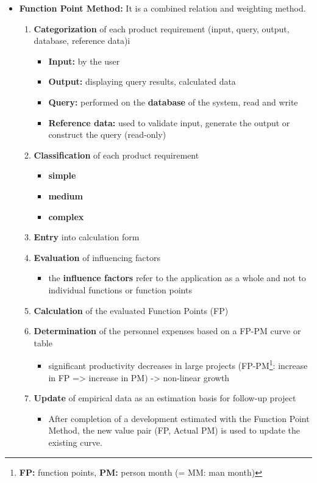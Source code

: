 \documentclass[ieeetran]{article}
\begin{document}
\begin{itemize}
\item \textbf{Function Point Method:} It is a combined relation and weighting method.
	\begin{enumerate}
	  \item \textbf{Categorization} of each product requirement (input, query, output, database, reference data)i
		  \begin{itemize}
		    \item \textbf{Input:} by the user
		\item \textbf{Output:} displaying query results, calculated data
		\item \textbf{Query:} performed on the \textbf{database} of the system, read and write
		\item \textbf{Reference data:} used to validate input, generate the output or construct the query (read-only)
		  \end{itemize}
\item \textbf{Classification} of each product requirement
	\begin{itemize}
	  \item \textbf{simple}
	  \item \textbf{medium} 
	  \item \textbf{complex} 
	\end{itemize}
	\item \textbf{Entry} into calculation form
	\item \textbf{Evaluation} of influencing factors
		\begin{itemize}
		  \item the \textbf{influence factors} refer to the application as a whole and not to individual functions or function points
		\end{itemize}
		\item \textbf{Calculation} of the evaluated Function Points (FP)
		\item \textbf{Determination} of the personnel expenses based on a FP-PM curve or table
			\begin{itemize}
				\item significant productivity decreases in large projects (FP-PM\footnote{\textbf{FP:} function points, \textbf{PM:} person month (= MM: man month)}: increase in FP => increase in PM) -> non-linear growth
			\end{itemize}
		\item \textbf{Update} of empirical data as an estimation basis for follow-up project
			\begin{itemize}
				\item After completion of a development estimated with the Function Point Method, the new value pair (FP, Actual PM) is used to update the existing curve. 

\end{itemize}
\end{enumerate}
\end{itemize}
\end{document}
